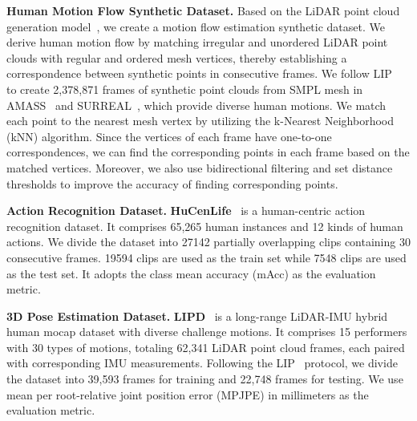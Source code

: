 \textbf{Human Motion Flow Synthetic Dataset. }
\label{subsubsec:HMFlowData}
Based on the LiDAR point cloud generation model~\cite{ren2023lidar,cong2021input}, we create a motion flow estimation synthetic dataset. 
We derive human motion flow by matching irregular and unordered LiDAR point clouds with regular and ordered mesh vertices, thereby establishing a correspondence between synthetic points in consecutive frames. 
We follow LIP~\cite{ren2023lidar} to create 2,378,871 frames of synthetic point clouds from SMPL mesh in AMASS~\cite{mahmood2019amass} and SURREAL~\cite{varol2017learning}, which provide diverse human motions. We match each point to the nearest mesh vertex by utilizing the k-Nearest Neighborhood (kNN) algorithm. Since the vertices of each frame have one-to-one correspondences, we can find the corresponding points in each frame based on the matched vertices. Moreover, we also use bidirectional filtering and set distance thresholds to improve the accuracy of finding corresponding points.

\textbf{Action Recognition Dataset. }
\textbf{HuCenLife}~\cite{xu2023human} is a human-centric action recognition dataset. It comprises 65,265 human instances and 12 kinds of human actions. We divide the dataset into 27142 partially overlapping clips containing 30 consecutive frames. 19594 clips are used as the train set while 7548 clips are used as the test set. It adopts the class mean accuracy (mAcc) as the evaluation metric.

\textbf{3D Pose Estimation Dataset. }
\textbf{LIPD}~\cite{ren2023lidar} is a long-range LiDAR-IMU hybrid human mocap dataset with diverse challenge motions. It comprises 15 performers with 30 types of motions, totaling 62,341 LiDAR point cloud frames, each paired with corresponding IMU measurements. Following the LIP~\cite{ren2023lidar} protocol, we divide the dataset into 39,593 frames for training and 22,748 frames for testing. We use mean per root-relative joint position error (MPJPE) in millimeters as the evaluation metric.

